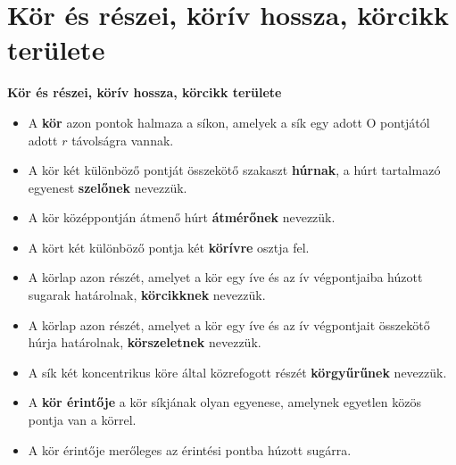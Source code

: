 \documentclass[11pt]{beamer}
\begin{document}
\section{\textbf{Kör és részei, körív hossza, körcikk területe}}
\begin{frame}[<+->]
\begin{block}{\textbf{Kör és részei, körív hossza, körcikk területe}}
\begin{itemize}[label=$\circ$]
\item A \textbf{kör} azon pontok halmaza a síkon, amelyek a sík egy adott O pontjától adott $r$ távolságra vannak.
\item A kör két különböző pontját összekötő szakaszt \textbf{húrnak}, a húrt tartalmazó egyenest \textbf{szelőnek} nevezzük.
\item A kör középpontján átmenő húrt \textbf{átmérőnek} nevezzük.
\item A kört két különböző pontja két \textbf{körívre} osztja fel.
\item A körlap azon részét, amelyet a kör egy íve és az ív végpontjaiba húzott sugarak határolnak, \textbf{körcikknek} nevezzük.
\item A körlap azon részét, amelyet a kör egy íve és az ív végpontjait összekötő húrja határolnak, \textbf{körszeletnek} nevezzük.
\item A sík két koncentrikus köre által közrefogott részét \textbf{körgyűrűnek} nevezzük.
\item A \textbf{kör érintője} a kör síkjának olyan egyenese, amelynek egyetlen közös pontja van a körrel.
\item A kör érintője merőleges az érintési pontba húzott sugárra.
\end{itemize}
\end{block}
\end{frame}
\end{document}
